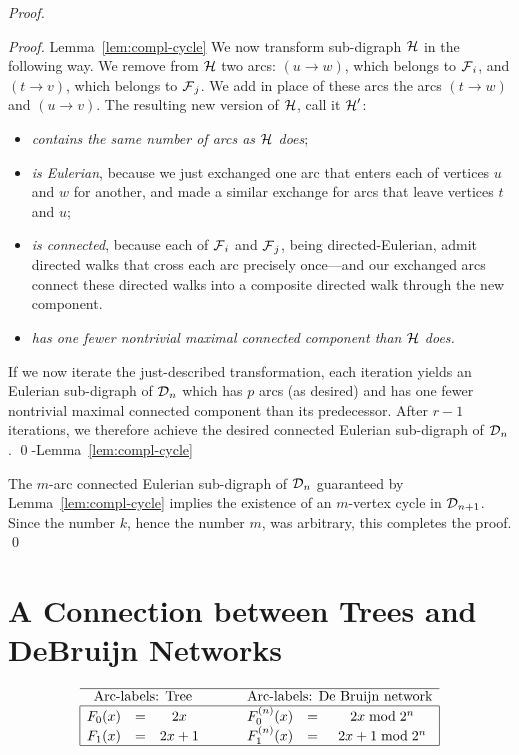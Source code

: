 \begin{proof}
\begin{proof}{Lemma~\ref{lem:compl-cycle}}
We now transform sub-digraph $\mbox{$\cal H$}$ in the following way. We remove from $\mbox{$\cal H$}$ two arcs: 
$(u \rightarrow w)$, which belongs to $\mbox{$\cal F$}_i$, and $(t \rightarrow v)$, which belongs to $\mbox{$\cal F$}_j$.  We
add in place of these arcs the arcs $(t \rightarrow w)$ and $(u \rightarrow v)$.  The resulting
new version of $\mbox{$\cal H$}$, call it $\mbox{$\cal H$}'$:
\begin{itemize}
\item
{\em contains the same number of arcs as $\mbox{$\cal H$}$ does};
\item
{\em is Eulerian}, because we just exchanged one arc that enters each of vertices $u$ and $w$
for another, and made a similar exchange for arcs that leave vertices $t$ and $u$;
\item
{\em is connected}, because each of $\mbox{$\cal F$}_i$ and $\mbox{$\cal F$}_j$, being directed-Eulerian, admit directed walks
that cross each arc precisely once---and our exchanged arcs connect these directed walks into
a composite directed walk through the new component.
\item
{\em has one fewer nontrivial maximal connected component than $\mbox{$\cal H$}$ does.}
\end{itemize}

If we now iterate the just-described transformation, each iteration yields an Eulerian sub-digraph
of $\mbox{$\cal D$}_n$ which has $p$ arcs (as desired) and has one fewer nontrivial maximal connected 
component than its predecessor.  After $r-1$ iterations, we therefore achieve the desired connected
Eulerian sub-digraph of $\mbox{$\cal D$}_n$.
\qed-Lemma~\ref{lem:compl-cycle}
\end{proof}

The $m$-arc connected Eulerian sub-digraph of $\mbox{$\cal D$}_n$ guaranteed by
Lemma~\ref{lem:compl-cycle} implies the existence of an $m$-vertex cycle in $\mbox{$\cal D$}_{n+1}$.  Since
the number $k$, hence the number $m$, was arbitrary, this completes the proof.  \qed
\end{proof}


\section{A Connection between Trees and DeBruijn Networks} 
\label{Appendix:tree-DB}

\[
\begin{array}{|ccccccc|}
\hline
\multicolumn{3}{c}{\mbox{Arc-labels: Tree}} & \hspace*{.2in}& \multicolumn{3}{c}{\mbox{Arc-labels: De Bruijn network}} \\
\hline 
F_0(x) & = & 2x      &  &  F^{(n)}_0(x) & = & 2x \bmod 2^n \\
F_1(x) & = & 2x+1  &  &  F^{(n)}_1(x) & = & 2x +1 \bmod 2^n \\ 
\hline
\end{array}
\]

